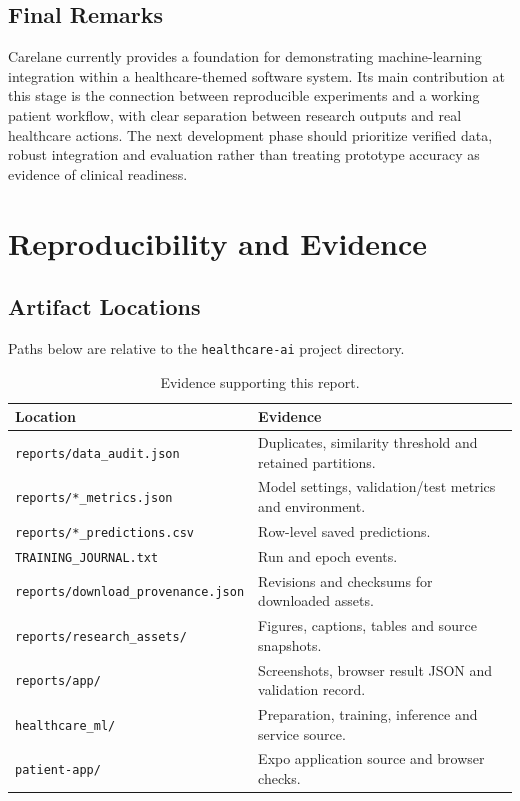 \documentclass{tietreport}
\begin{document}
\section{Final Remarks}
Carelane currently provides a foundation for demonstrating machine-learning integration within a healthcare-themed software system. Its main contribution at this stage is the connection between reproducible experiments and a working patient workflow, with clear separation between research outputs and real healthcare actions. The next development phase should prioritize verified data, robust integration and evaluation rather than treating prototype accuracy as evidence of clinical readiness.

\appendix
\chapter{Reproducibility and Evidence}
\section{Artifact Locations}
Paths below are relative to the \texttt{healthcare-ai} project directory.
\begin{table}[H]\centering\small
\begin{tabularx}{\textwidth}{p{}Y}\toprule Location & Evidence \\ \midrule
\texttt{reports/data\_audit.json} & Duplicates, similarity threshold and retained partitions. \\
\texttt{reports/*\_metrics.json} & Model settings, validation/test metrics and environment. \\
\texttt{reports/*\_predictions.csv} & Row-level saved predictions. \\
\texttt{TRAINING\_JOURNAL.txt} & Run and epoch events. \\
\texttt{reports/download\_provenance.json} & Revisions and checksums for downloaded assets. \\
\texttt{reports/research\_assets/} & Figures, captions, tables and source snapshots. \\
\texttt{reports/app/} & Screenshots, browser result JSON and validation record. \\
\texttt{healthcare\_ml/} & Preparation, training, inference and service source. \\
\texttt{patient-app/} & Expo application source and browser checks. \\
\bottomrule\end{tabularx}
\caption{Evidence supporting this report.}
\end{table}
\end{document}
